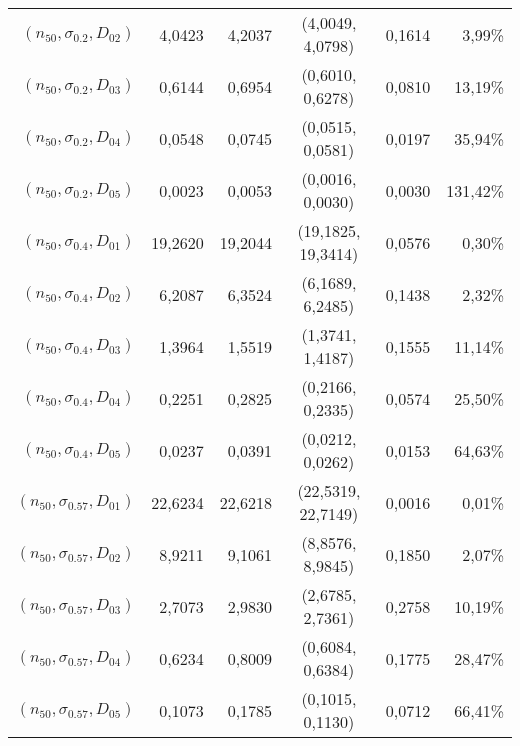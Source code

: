 \documentclass[preprint,12pt]{elsarticle}
\begin{document}
\begin{table}[htbp]
\begin{tabular}{rrrcrr}
$(n_{50},\sigma_{0.2},D_{02})$ & 4,0423 & 4,2037 & (4,0049, 4,0798) & 0,1614 & 3,99\% \\
$(n_{50},\sigma_{0.2},D_{03})$ & 0,6144 & 0,6954 & (0,6010, 0,6278) & 0,0810 & 13,19\% \\
$(n_{50},\sigma_{0.2},D_{04})$ & 0,0548 & 0,0745 & (0,0515, 0,0581) & 0,0197 & 35,94\% \\
$(n_{50},\sigma_{0.2},D_{05})$ & 0,0023 & 0,0053 & (0,0016, 0,0030) & 0,0030 & 131,42\% \\
$(n_{50},\sigma_{0.4},D_{01})$ & 19,2620 & 19,2044 & (19,1825, 19,3414) & 0,0576 & 0,30\% \\
$(n_{50},\sigma_{0.4},D_{02})$ & 6,2087 & 6,3524 & (6,1689, 6,2485) & 0,1438 & 2,32\% \\
$(n_{50},\sigma_{0.4},D_{03})$ & 1,3964 & 1,5519 & (1,3741, 1,4187) & 0,1555 & 11,14\% \\
$(n_{50},\sigma_{0.4},D_{04})$ & 0,2251 & 0,2825 & (0,2166, 0,2335) & 0,0574 & 25,50\% \\
$(n_{50},\sigma_{0.4},D_{05})$ & 0,0237 & 0,0391 & (0,0212, 0,0262) & 0,0153 & 64,63\% \\
$(n_{50},\sigma_{0.57},D_{01})$ & 22,6234 & 22,6218 & (22,5319, 22,7149) & 0,0016 & 0,01\% \\
$(n_{50},\sigma_{0.57},D_{02})$  & 8,9211 & 9,1061 & (8,8576, 8,9845) & 0,1850 & 2,07\% \\
$(n_{50},\sigma_{0.57},D_{03})$  & 2,7073 & 2,9830 & (2,6785, 2,7361) & 0,2758 & 10,19\% \\
$(n_{50},\sigma_{0.57},D_{04})$  & 0,6234 & 0,8009 & (0,6084, 0,6384) & 0,1775 & 28,47\% \\
$(n_{50},\sigma_{0.57},D_{05})$  & 0,1073 & 0,1785 & (0,1015, 0,1130) & 0,0712 & 66,41\% \\

    \bottomrule
    \end{tabular}%
  \label{tab:addlabel}%
\end{table}%
\end{document}
